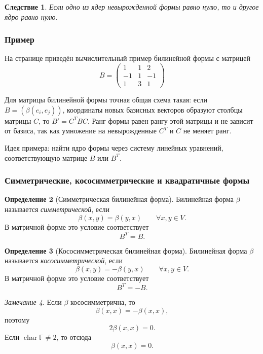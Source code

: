 \documentclass[12pt,a4paper]{article}
\theoremstyle{definition}
\newtheorem{definition}{Определение}[section]
\theoremstyle{plain}
\newtheorem{corollary}[definition]{Следствие}
\theoremstyle{remark}
\newtheorem{remark}[definition]{Замечание}
\newenvironment{knowledgefix}{\begin{clarifybox}}{\end{clarifybox}}
\newcommand{\F}{\mathbb{F}}
\begin{document}
\begin{corollary}
Если одно из ядер невырожденной формы равно нулю, то и другое ядро равно нулю.
\end{corollary}

\subsubsection*{Пример}

На странице приведён вычислительный пример билинейной формы с матрицей
\[
    B=\begin{pmatrix}
        1 & 1 & 2\\
        -1 & 1 & -1\\
        1 & 3 & 1
    \end{pmatrix}
\]
\begin{knowledgefix}
Для матрицы билинейной формы точная общая схема такая: если \(B=(\beta(e_i,e_j))\), координаты новых базисных векторов образуют столбцы матрицы \(C\), то \(B'=C^TBC\). Ранг формы равен рангу этой матрицы и не зависит от базиса, так как умножение на невырожденные \(C^T\) и \(C\) не меняет ранг.
\end{knowledgefix}

Идея примера: найти ядро формы через систему линейных уравнений, соответствующую матрице $B$ или $B^T$.

\subsubsection{Симметрические, кососимметрические и квадратичные формы}


\begin{definition}[Симметрическая билинейная форма]
Билинейная форма $\beta$ называется \emph{симметрической}, если
\[
    \beta(x,y)=\beta(y,x)
    \qquad \forall x,y\in V.
\]
В матричной форме это условие соответствует
\[
    B^T=B.
\]
\end{definition}

\begin{definition}[Кососимметрическая билинейная форма]
Билинейная форма $\beta$ называется \emph{кососимметрической}, если
\[
    \beta(x,y)=-\beta(y,x)
    \qquad \forall x,y\in V.
\]
В матричной форме это условие соответствует
\[
    B^T=-B.
\]
\end{definition}

\begin{remark}
Если $\beta$ кососимметрична, то
\[
    \beta(x,x)=-\beta(x,x),
\]
поэтому
\[
    2\beta(x,x)=0.
\]
Если $\operatorname{char}\F\ne 2$, то отсюда
\[
    \beta(x,x)=0.
\]
\end{remark}
\end{document}
